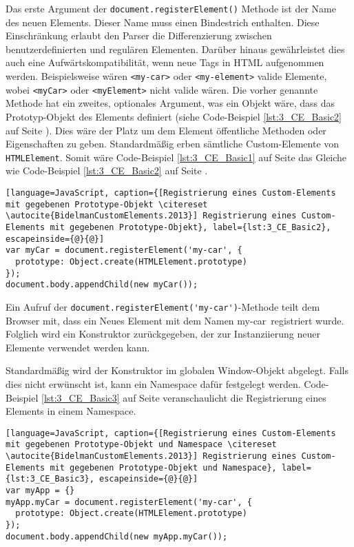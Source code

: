 Das erste Argument der \lstinline|document.registerElement()| Methode ist der Name des neuen Elements. Dieser Name muss einen Bindestrich enthalten. Diese Einschränkung erlaubt den Parser die Differenzierung zwischen benutzerdefinierten und regulären Elementen. Darüber hinaus gewährleistet dies auch eine Aufwärtskompatibilität, wenn neue Tags in HTML aufgenommen werden. Beispielsweise wären \lstinline|<my-car>| oder \lstinline|<my-element>| valide Elemente, wobei \lstinline|<myCar>| oder \lstinline|<myElement>| nicht valide wären. Die vorher genannte Methode hat ein zweites, optionales Argument, was ein Objekt wäre, dass das Prototyp-Objekt des Elements definiert (siehe Code-Beispiel \ref{lst:3_CE_Basic2} auf Seite \pageref{lst:3_CE_Basic2}). Dies wäre der Platz um dem Element öffentliche Methoden oder Eigenschaften zu geben. Standardmäßig erben sämtliche Custom-Elemente von \lstinline|HTMLElement|. Somit wäre Code-Beispiel \ref{lst:3_CE_Basic1} auf Seite \pageref{lst:3_CE_Basic1} das Gleiche wie Code-Beispiel \ref{lst:3_CE_Basic2} auf Seite \pageref{lst:3_CE_Basic2}.

\begin{lstlisting}[language=JavaScript, caption={[Registrierung eines Custom-Elements mit gegebenen Prototype-Objekt \citereset \autocite{BidelmanCustomElements.2013}] Registrierung eines Custom-Elements mit gegebenen Prototype-Objekt}, label={lst:3_CE_Basic2}, escapeinside={@}{@}]
var myCar = document.registerElement('my-car', {
  prototype: Object.create(HTMLElement.prototype)
});
document.body.appendChild(new myCar());
\end{lstlisting}

Ein Aufruf der \lstinline|document.registerElement('my-car')|-Methode teilt dem Browser mit, dass ein Neues Element mit dem Namen \glqq my-car\grqq\ registriert wurde. Folglich wird ein Konstruktor zurückgegeben, der zur Instanziierung neuer Elemente verwendet werden kann.

Standardmäßig wird der Konstruktor im globalen Window-Objekt abgelegt. Falls dies nicht erwünscht ist, kann ein Namespace dafür festgelegt werden. Code-Beispiel \ref{lst:3_CE_Basic3} auf Seite \pageref{lst:3_CE_Basic3} veranschaulicht die Registrierung eines Elements in einem Namespace.

\begin{lstlisting}[language=JavaScript, caption={[Registrierung eines Custom-Elements mit gegebenen Prototype-Objekt und Namespace \citereset \autocite{BidelmanCustomElements.2013}] Registrierung eines Custom-Elements mit gegebenen Prototype-Objekt und Namespace}, label={lst:3_CE_Basic3}, escapeinside={@}{@}]
var myApp = {}
myApp.myCar = document.registerElement('my-car', {
  prototype: Object.create(HTMLElement.prototype)
});
document.body.appendChild(new myApp.myCar());
\end{lstlisting}

